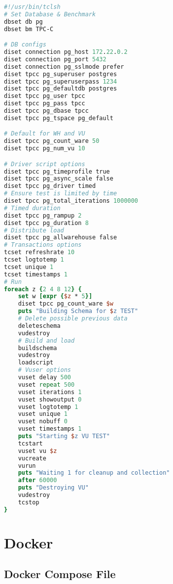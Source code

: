 \begin{lstlisting}[language=Tcl, caption={TCL script for PostgreSQL}, label={lst:tcl-postgresql}]
#!/usr/bin/tclsh
# Set Database & Benchmark
dbset db pg
dbset bm TPC-C

# DB configs
diset connection pg_host 172.22.0.2
diset connection pg_port 5432
diset connection pg_sslmode prefer
diset tpcc pg_superuser postgres
diset tpcc pg_superuserpass 1234
diset tpcc pg_defaultdb postgres
diset tpcc pg_user tpcc
diset tpcc pg_pass tpcc
diset tpcc pg_dbase tpcc
diset tpcc pg_tspace pg_default

# Default for WH and VU
diset tpcc pg_count_ware 50
diset tpcc pg_num_vu 10

# Driver script options
diset tpcc pg_timeprofile true
diset tpcc pg_async_scale false
diset tpcc pg_driver timed
# Ensure test is limited by time
diset tpcc pg_total_iterations 1000000
# Timed duration
diset tpcc pg_rampup 2
diset tpcc pg_duration 8
# Distribute load
diset tpcc pg_allwarehouse false
# Transactions options
tcset refreshrate 10
tcset logtotemp 1
tcset unique 1
tcset timestamps 1
# Run
foreach z {2 4 8 12} {
    set w [expr {$z * 5}]
    diset tpcc pg_count_ware $w
    puts "Building Schema for $z TEST"
    # Delete possible previous data
    deleteschema
    vudestroy
    # Build and load
    buildschema
    vudestroy
    loadscript
    # Vuser options
    vuset delay 500
    vuset repeat 500
    vuset iterations 1
    vuset showoutput 0
    vuset logtotemp 1
    vuset unique 1
    vuset nobuff 0
    vuset timestamps 1
    puts "Starting $z VU TEST"
    tcstart
    vuset vu $z
    vucreate
    vurun
    puts "Waiting 1 for cleanup and collection"
    after 60000
    puts "Destroying VU"
    vudestroy
    tcstop
}
\end{lstlisting}

\section{Docker}
\label{sec:docker}

\subsection{Docker Compose File}
\label{sec:docker-compose}

